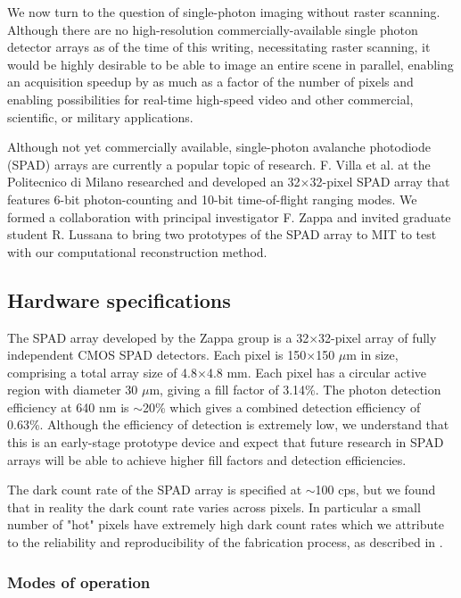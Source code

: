 We now turn to the question of single-photon imaging without raster scanning. Although there are no high-resolution commercially-available single photon detector arrays as of the time of this writing, necessitating raster scanning, it would be highly desirable to be able to image an entire scene in parallel, enabling an acquisition speedup by as much as a factor of the number of pixels and enabling possibilities for real-time high-speed video and other commercial, scientific, or military applications.

Although not yet commercially available, single-photon avalanche photodiode (SPAD) arrays are currently a popular topic of research. F. Villa et al. at the Politecnico di Milano researched and developed an 32$\times$32-pixel SPAD array \cite{villa-thesis} that features 6-bit photon-counting and 10-bit time-of-flight ranging modes. We formed a collaboration with principal investigator F. Zappa and invited graduate student R. Lussana to bring two prototypes of the SPAD array to MIT to test with our computational reconstruction method.

\subsection{Hardware specifications}
The SPAD array developed by the Zappa group is a 32$\times$32-pixel array of fully independent CMOS SPAD detectors. Each pixel is 150$\times$150 $\mu$m in size, comprising a total array size of 4.8$\times$4.8 mm. Each pixel has a circular active region with diameter 30 $\mu$m, giving a fill factor of 3.14\%. The photon detection efficiency at 640 nm is $\sim$20\% which gives a combined detection efficiency of 0.63\%. Although the efficiency of detection is extremely low, we understand that this is an early-stage prototype device and expect that future research in SPAD arrays will be able to achieve higher fill factors and detection efficiencies.

The dark count rate of the SPAD array is specified at $\sim$100 cps, but we found that in reality the dark count rate varies across pixels. In particular a small number of "hot" pixels have extremely high dark count rates which we attribute to the reliability and reproducibility of the fabrication process, as described in \cite{villa-thesis}.

\subsubsection{Modes of operation}


